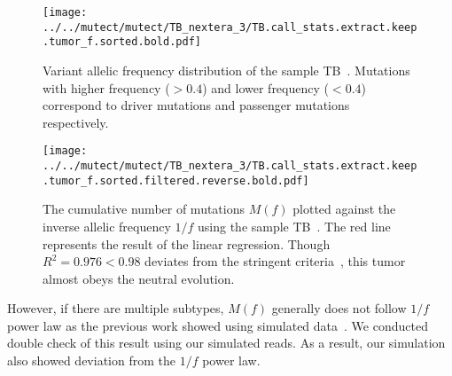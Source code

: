 \documentclass{article}
\begin{document}
\begin{figure}[H]
 \begin{minipage}[c]{0.47\hsize}
 \begin{center}
  \texttt{[image: ../../mutect/mutect/TB\_nextera\_3/TB.call\_stats.extract.keep.tumor\_f.sorted.bold.pdf]}
 \end{center}
    \caption{
  Variant allelic frequency distribution of the sample TB~\cite{williams2016identification}.
  Mutations with higher frequency ($>0.4$) and lower frequency ($<0.4$) correspond to driver mutations and passenger mutations respectively.
  }\label{TB_vaf}
\end{minipage}
 \hspace{1truecm}
\begin{minipage}[c]{0.47\hsize}
 \begin{center}
 \texttt{[image: ../../mutect/mutect/TB\_nextera\_3/TB.call\_stats.extract.keep.tumor\_f.sorted.filtered.reverse.bold.pdf]}
 \end{center}
   \caption{
  The cumulative number of mutations $M(f)$ plotted against the inverse allelic frequency $1/f$
  using the sample TB~\cite{williams2016identification}.
  The red line represents the result of the linear regression.
 Though $R^2 = 0.976 < 0.98$ deviates from the stringent criteria~\cite{williams2016identification}, this tumor almost obeys the neutral evolution.
  }
 \label{TB_linear_regression}
\end{minipage}
\end{figure}

However, if there are multiple subtypes, $M(f)$ generally does not follow $1/f$ power law as the previous work showed using simulated data~\cite{williams2016identification}.
We conducted double check of this result using our simulated reads. As a result, our simulation also showed deviation from the $1/f$ power law.
\end{document}
